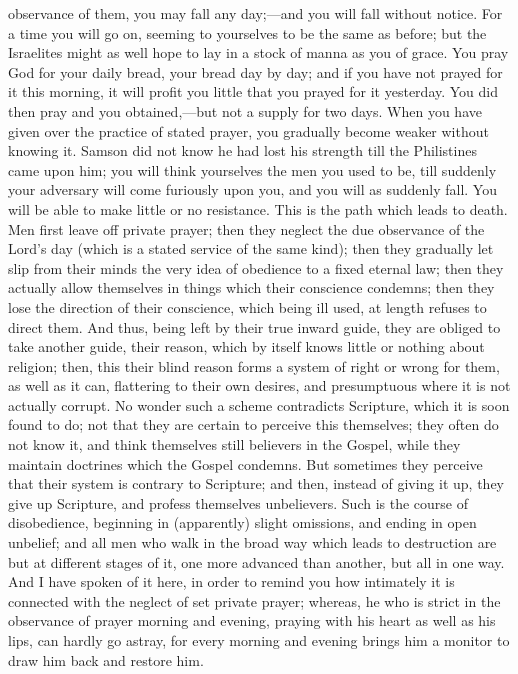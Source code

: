 observance of them, you may fall any day;—and you
will fall without notice. For a time you will go on,
seeming to yourselves to be the same as before; but the
Israelites might as well hope to lay in a stock of manna
as you of grace. You pray God for your daily bread, your
bread day by day; and if you have not prayed for it this
morning, it will profit you little that you prayed for it
yesterday. You did then pray and you obtained,—but
not a supply for two days. When you have given over the
practice of stated prayer, you gradually become weaker
without knowing it. Samson did not know he had lost his
strength till the Philistines came upon him; you will
think yourselves the men you used to be, till suddenly
your adversary will come furiously upon you, and you will
as suddenly fall. You will be able to make little or no
resistance. This is the path which leads to death. Men
first leave off private prayer; then they neglect the due
observance of the Lord's day (which is a stated service
of the same kind); then they gradually let slip from
their minds the very idea of obedience to a fixed eternal
law; then they actually allow themselves in things which
their conscience condemns; then they lose the direction
of their conscience, which being ill used, at length
refuses to direct them. And thus, being left by their
true inward guide, they are obliged to take another
guide, their reason, which by itself knows little or
nothing about religion; then, this their blind reason
forms a system of right or wrong for them, as well as it
can, flattering to their own desires, and presumptuous
where it is not actually corrupt. No wonder such a scheme
contradicts Scripture, which it is soon found to do; not
that they are certain to perceive this themselves; they
often do not know it, and think themselves still
believers in the Gospel, while they maintain doctrines
which the Gospel condemns. But sometimes they perceive
that their system is contrary to Scripture; and then,
instead of giving it up, they give up Scripture, and
profess themselves unbelievers. Such is the course of
disobedience, beginning in (apparently) slight omissions,
and ending in open unbelief; and all men who walk in the
broad way which leads to destruction are but at different
stages of it, one more advanced than another, but all in
one way. And I have spoken of it here, in order to remind
you how intimately it is connected with the neglect of
set private prayer; whereas, he who is strict in the
observance of prayer morning and evening, praying with
his heart as well as his lips, can hardly go astray, for
every morning and evening brings him a monitor to draw
him back and restore him.

